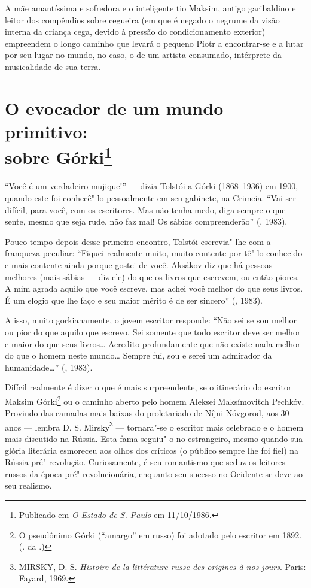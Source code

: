 A mãe amantíssima e sofredora e o inteligente tio Maksim, antigo
garibaldino e leitor dos compêndios sobre cegueira (em que é negado
o negrume da visão interna da criança cega, devido à pressão do
condicionamento exterior) empreendem o longo caminho que levará o
pequeno Piotr a encontrar-se e a lutar por seu lugar no mundo, no
caso, o de um artista consumado, intérprete da musicalidade de sua
terra.

\chapter{O evocador de um mundo primitivo:\\
 sobre Górki\footnote{Publicado em \emph{O Estado de S. Paulo} em 11/10/1986.}}
\label{primitivo}

``Você é um verdadeiro mujique!'' --- dizia Tolstói a Górki
(1868--1936) em 1900, quando este foi conhecê"-lo pessoalmente em
seu gabinete, na Crimeia. ``Vai ser difícil, para você, com os
escritores. Mas não tenha medo, diga sempre o que sente, mesmo
que seja rude, não faz mal! Os sábios compreenderão'' (, 1983).

Pouco tempo depois desse primeiro encontro, Tolstói escrevia"-lhe
com a franqueza peculiar: ``Fiquei realmente muito, muito contente
por tê"-lo conhecido e mais contente ainda porque gostei de você.
Aksákov diz que há pessoas melhores (mais sábias --- diz ele) do
que os livros que escrevem, ou então piores. A mim agrada aquilo
que você escreve, mas achei você melhor do que seus livros. É um
elogio que lhe faço e seu maior mérito é de ser sincero''
(, 1983).

A isso, muito gorkianamente, o jovem escritor responde: ``Não sei
se sou melhor ou pior do que aquilo que escrevo. Sei somente que
todo escritor deve ser melhor e maior do que seus livros\ldots{}
Acredito profundamente que não existe nada melhor do que o homem
neste mundo\ldots{} Sempre fui, sou e serei um admirador da
humanidade\ldots{}'' (, 1983).

Difícil realmente é dizer o que é mais surpreendente, se o
itinerário do escritor Maksim Górki\footnote{O pseudônimo Górki
(``amargo'' em russo) foi adotado pelo escritor em 1892.
(. da .)} ou o caminho aberto pelo homem Aleksei
Maksímovitch Pechkóv. Provindo das camadas mais baixas do
proletariado de Níjni Nóvgorod, aos 30 anos --- lembra D. S.
Mirsky\footnote{\scalebox{0.8} {MIRSKY}, D. S. \emph{Histoire de la
littérature russe des origines à nos jours}. Paris: Fayard,
1969.} --- tornara"-se o escritor mais celebrado e o homem mais
discutido na Rússia. Esta fama seguiu"-o no estrangeiro, mesmo
quando sua glória literária esmoreceu aos olhos dos críticos (o
público sempre lhe foi fiel) na Rússia pré"-revolução. Curiosamente,
é seu romantismo que seduz os leitores russos da época pré"-revolucionária,
enquanto seu sucesso no Ocidente se deve ao seu realismo.

